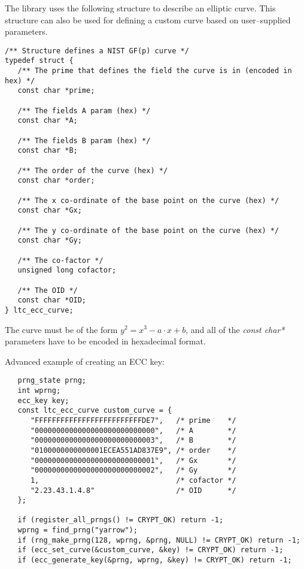 \documentclass[synpaper]{book}
\begin{document}
The library uses the following structure to describe an elliptic curve.
This structure can also be used for defining a custom curve based on user--supplied parameters.

\begin{verbatim}
/** Structure defines a NIST GF(p) curve */
typedef struct {
   /** The prime that defines the field the curve is in (encoded in hex) */
   const char *prime;

   /** The fields A param (hex) */
   const char *A;

   /** The fields B param (hex) */
   const char *B;

   /** The order of the curve (hex) */
   const char *order;

   /** The x co-ordinate of the base point on the curve (hex) */
   const char *Gx;

   /** The y co-ordinate of the base point on the curve (hex) */
   const char *Gy;

   /** The co-factor */
   unsigned long cofactor;

   /** The OID */
   const char *OID;
} ltc_ecc_curve;
\end{verbatim}

The curve must be of the form $y^2 = x^3 - a \cdot x + b$, and all of the \textit{const char*} parameters have to be encoded in hexadecimal format.

Advanced example of creating an ECC key:
\begin{small}
\begin{verbatim}
   prng_state prng;
   int wprng;
   ecc_key key;
   const ltc_ecc_curve custom_curve = {
      "FFFFFFFFFFFFFFFFFFFFFFFFFDE7",   /* prime    */
      "0000000000000000000000000000",   /* A        */
      "0000000000000000000000000003",   /* B        */
      "0100000000000001ECEA551AD837E9", /* order    */
      "0000000000000000000000000001",   /* Gx       */
      "0000000000000000000000000002",   /* Gy       */
      1,                                /* cofactor */
      "2.23.43.1.4.8"                   /* OID      */
   };

   if (register_all_prngs() != CRYPT_OK) return -1;
   wprng = find_prng("yarrow");
   if (rng_make_prng(128, wprng, &prng, NULL) != CRYPT_OK) return -1;
   if (ecc_set_curve(&custom_curve, &key) != CRYPT_OK) return -1;
   if (ecc_generate_key(&prng, wprng, &key) != CRYPT_OK) return -1;
\end{verbatim}
\end{small}
\end{document}

